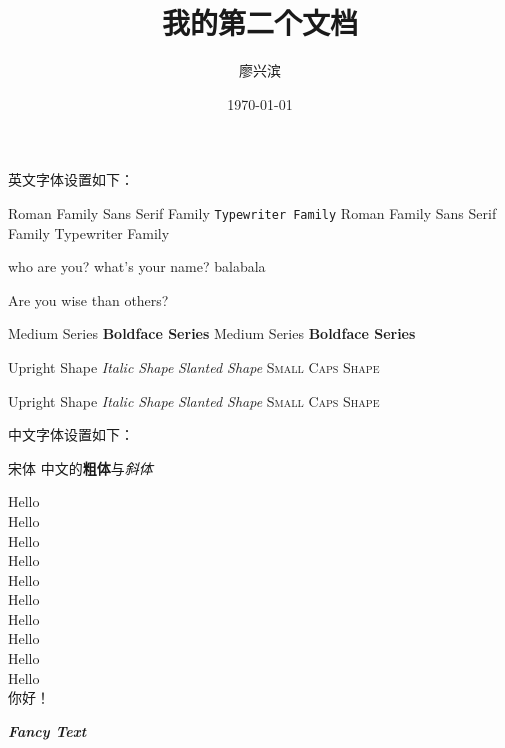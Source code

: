 \documentclass[12pt]{article} %
\title{\heiti 我的第二个文档}
\author{\kaishu 廖兴滨}
\date{\today}
\newcommand{\myfont}{\textit{\textbf{Fancy Text}}} %
\begin{document}
	\maketitle
	
	英文字体设置如下：
	
	\textrm{Roman Family} \textsf{Sans Serif Family} \texttt{Typewriter Family}
	{\rmfamily Roman Family} {\sffamily Sans Serif Family} {\ttfamily Typewriter Family}

	
	\sffamily who are you? what's your name? balabala
	
	\ttfamily Are you wise than others?
	
	\textmd{Medium Series} \textbf{Boldface Series} %
	{\mdseries Medium Series} {\bfseries Boldface Series}  %
	
	\textup{Upright Shape} \textit{Italic Shape}
	\textsl{Slanted Shape} \textsc{Small Caps Shape}
	
	{\upshape Upright Shape} {\itshape Italic Shape}
	{\slshape Slanted Shape} {\scshape Small Caps Shape}
	
	中文字体设置如下：%
	
	{\songti 宋体}   
	中文的\textbf{粗体}与\textit{斜体}
	
	{\tiny Hello }\\
	{\scriptsize Hello}\\
	{\footnotesize Hello}\\
	{\small Hello}\\
	{\normalsize Hello}\\
	{\large Hello}\\
	{\Large Hello}\\
	{\LARGE Hello}\\
	{\huge Hello}\\
	{\Huge Hello}\\
	
	  你好！
	
	\myfont

	
\end{document}
